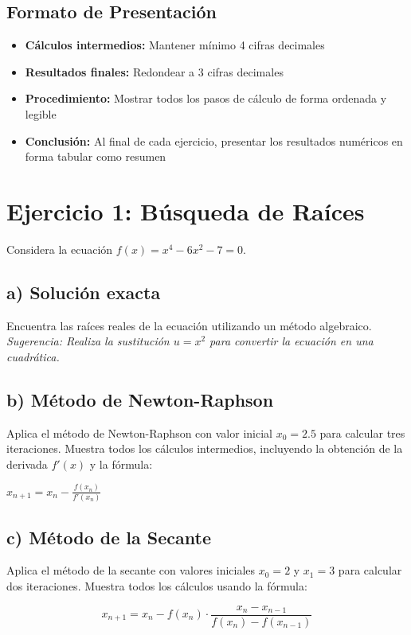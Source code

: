 \documentclass[12pt,a4paper]{article}
\begin{document}
\subsection*{Formato de Presentación}
\begin{itemize}
\item \textbf{Cálculos intermedios:} Mantener mínimo 4 cifras decimales
\item \textbf{Resultados finales:} Redondear a 3 cifras decimales
\item \textbf{Procedimiento:} Mostrar todos los pasos de cálculo de forma ordenada y legible
\item \textbf{Conclusión:} Al final de cada ejercicio, presentar los resultados numéricos en forma tabular como resumen
\end{itemize}

\section*{Ejercicio 1: Búsqueda de Raíces}

Considera la ecuación $f(x) = x^4 - 6x^2 - 7 = 0$.

\subsection*{a) Solución exacta}
Encuentra las raíces reales de la ecuación utilizando un método algebraico. \textit{Sugerencia: Realiza la sustitución $u = x^2$ para convertir la ecuación en una cuadrática.}

\subsection*{b) Método de Newton-Raphson}
Aplica el método de Newton-Raphson con valor inicial $x_0 = 2.5$ para calcular tres iteraciones. Muestra todos los cálculos intermedios, incluyendo la obtención de la derivada $f'(x)$ y la fórmula:

$x_{n+1} = x_n - \frac{f(x_n)}{f'(x_n)}$

\subsection*{c) Método de la Secante}
Aplica el método de la secante con valores iniciales $x_0 = 2$ y $x_1 = 3$ para calcular dos iteraciones. Muestra todos los cálculos usando la fórmula:

$$x_{n+1} = x_n - f(x_n) \cdot \frac{x_n - x_{n-1}}{f(x_n) - f(x_{n-1})}$$
\end{document}

